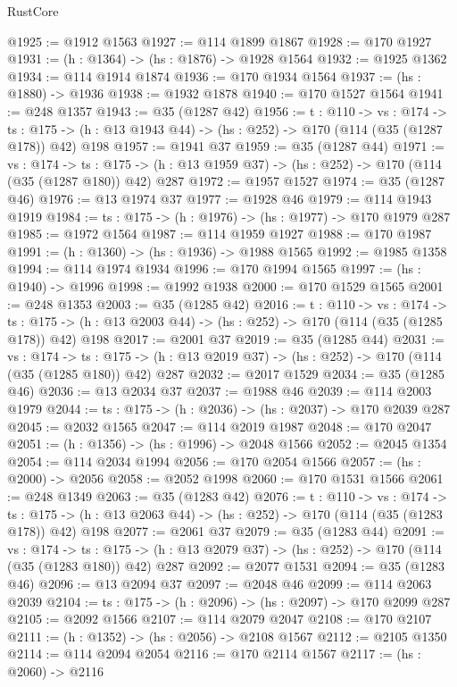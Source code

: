 \begin{lexlean}{RustCore}
\begin{coremodule}
@1925 := @1912 @1563
@1927 := @114 @1899 @1867
@1928 := @170 @1927
@1931 := (h : @1364) -> (hs : @1876) -> @1928 @1564
@1932 := @1925 @1362
@1934 := @114 @1914 @1874
@1936 := @170 @1934 @1564
@1937 := (hs : @1880) -> @1936
@1938 := @1932 @1878
@1940 := @170 @1527 @1564
@1941 := @248 @1357
@1943 := @35 (@1287 @42)
@1956 := {t : @110} ->
  {vs : @174} ->
  {ts : @175} -> (h : @13 @1943 @44) -> (hs : @252) -> @170 (@114 (@35 (@1287 @178)) @42) @198
@1957 := @1941 @37
@1959 := @35 (@1287 @44)
@1971 := {vs : @174} ->
  {ts : @175} -> (h : @13 @1959 @37) -> (hs : @252) -> @170 (@114 (@35 (@1287 @180)) @42) @287
@1972 := @1957 @1527
@1974 := @35 (@1287 @46)
@1976 := @13 @1974 @37
@1977 := @1928 @46
@1979 := @114 @1943 @1919
@1984 := {ts : @175} -> (h : @1976) -> (hs : @1977) -> @170 @1979 @287
@1985 := @1972 @1564
@1987 := @114 @1959 @1927
@1988 := @170 @1987
@1991 := (h : @1360) -> (hs : @1936) -> @1988 @1565
@1992 := @1985 @1358
@1994 := @114 @1974 @1934
@1996 := @170 @1994 @1565
@1997 := (hs : @1940) -> @1996
@1998 := @1992 @1938
@2000 := @170 @1529 @1565
@2001 := @248 @1353
@2003 := @35 (@1285 @42)
@2016 := {t : @110} ->
  {vs : @174} ->
  {ts : @175} -> (h : @13 @2003 @44) -> (hs : @252) -> @170 (@114 (@35 (@1285 @178)) @42) @198
@2017 := @2001 @37
@2019 := @35 (@1285 @44)
@2031 := {vs : @174} ->
  {ts : @175} -> (h : @13 @2019 @37) -> (hs : @252) -> @170 (@114 (@35 (@1285 @180)) @42) @287
@2032 := @2017 @1529
@2034 := @35 (@1285 @46)
@2036 := @13 @2034 @37
@2037 := @1988 @46
@2039 := @114 @2003 @1979
@2044 := {ts : @175} -> (h : @2036) -> (hs : @2037) -> @170 @2039 @287
@2045 := @2032 @1565
@2047 := @114 @2019 @1987
@2048 := @170 @2047
@2051 := (h : @1356) -> (hs : @1996) -> @2048 @1566
@2052 := @2045 @1354
@2054 := @114 @2034 @1994
@2056 := @170 @2054 @1566
@2057 := (hs : @2000) -> @2056
@2058 := @2052 @1998
@2060 := @170 @1531 @1566
@2061 := @248 @1349
@2063 := @35 (@1283 @42)
@2076 := {t : @110} ->
  {vs : @174} ->
  {ts : @175} -> (h : @13 @2063 @44) -> (hs : @252) -> @170 (@114 (@35 (@1283 @178)) @42) @198
@2077 := @2061 @37
@2079 := @35 (@1283 @44)
@2091 := {vs : @174} ->
  {ts : @175} -> (h : @13 @2079 @37) -> (hs : @252) -> @170 (@114 (@35 (@1283 @180)) @42) @287
@2092 := @2077 @1531
@2094 := @35 (@1283 @46)
@2096 := @13 @2094 @37
@2097 := @2048 @46
@2099 := @114 @2063 @2039
@2104 := {ts : @175} -> (h : @2096) -> (hs : @2097) -> @170 @2099 @287
@2105 := @2092 @1566
@2107 := @114 @2079 @2047
@2108 := @170 @2107
@2111 := (h : @1352) -> (hs : @2056) -> @2108 @1567
@2112 := @2105 @1350
@2114 := @114 @2094 @2054
@2116 := @170 @2114 @1567
@2117 := (hs : @2060) -> @2116

\end{coremodule}
\end{lexlean}
